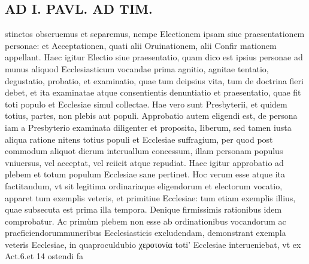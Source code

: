 \documentclass{article}
\begin{document}
\begin{pages}
\section*{AD I. PAVL. AD TIM. }\pstart stinctos obseruemus et separemus, nempe Electionem ipsam siue praesentationem personae: et Acceptationen, quati alii Oruinationem, alii Confir mationem appellant.  \pend\pstart Haec igitur Electio siue praesentatio, quam dico est ipsius personae ad munus aliquod Ecclesiasticum vocandae prima agnitio, agnitae tentatio, degustatio, probatio, et examinatio, quae tum deipsius vita, tum de doctrina fieri debet, et ita examinatae atque consentientis denuntiatio et praesentatio, quae fit toti populo et Ecclesiae simul collectae. Hae vero sunt Presbyterii, et quidem totius, partes, non plebis aut populi.  \pend\pstart Approbatio autem eligendi est, de persona iam a Presbyterio examinata diligenter et proposita, Iiberum, sed tamen iusta aliqua ratione nitens totius populi et Ecclesiae suffragium, per quod post commodum aliquot dierum interuallum concessum, illam personam populus vniuersus, vel acceptat, vel reiicit atque repudiat. Haec igitur approbatio ad plebem et totum populum Ecclesiae sane pertinet.  \pend\pstart Hoc verum esse atque ita factitandum, vt sit legitima ordinariaque eligendorum et electorum vocatio, apparet tum exemplis veteris, et primitiue Ecclesiae: tum etiam exemplis illius, quae subsecuta est prima illa tempora. Denique firmissimis rationibus idem comprobatur.  \pend\pstart Ac primùm plebem non esse ab ordinationibus vocandorum ac praeficiendorummuneribus Ecclesiasticis excludendam, demonstrant exempla veteris Ecclesiae, in quaproculdubio χεροτονία toti' Ecclesiae interueniebat, vt ex Act.6.et 14 ostendi fa\pend

\end{pages}
\end{document}
